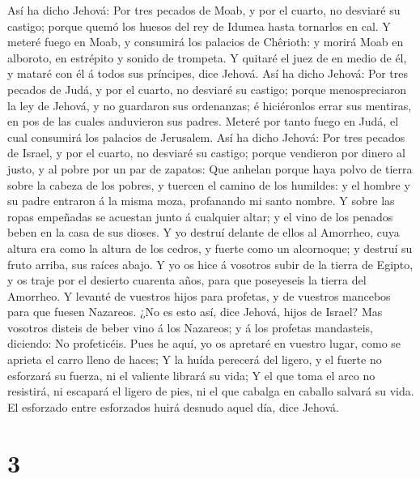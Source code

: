  Así ha dicho Jehová: Por tres pecados de Moab, y por el
cuarto, no desviaré su castigo; porque quemó los huesos del rey de
Idumea hasta tornarlos en cal.  Y meteré fuego en Moab, y
consumirá los palacios de Chêrioth: y morirá Moab en alboroto, en
estrépito y sonido de trompeta.  Y quitaré el juez de en
medio de él, y mataré con él á todos sus príncipes, dice Jehová.
 Así ha dicho Jehová: Por tres pecados de Judá, y por el
cuarto, no desviaré su castigo; porque menospreciaron la ley de Jehová,
y no guardaron sus ordenanzas; é hiciéronlos errar sus mentiras, en pos
de las cuales anduvieron sus padres.  Meteré por tanto
fuego en Judá, el cual consumirá los palacios de Jerusalem.
 Así ha dicho Jehová: Por tres pecados de Israel, y por el
cuarto, no desviaré su castigo; porque vendieron por dinero al justo, y
al pobre por un par de zapatos:  Que anhelan porque haya
polvo de tierra sobre la cabeza de los pobres, y tuercen el camino de
los humildes: y el hombre y su padre entraron á la misma moza,
profanando mi santo nombre.  Y sobre las ropas empeñadas
se acuestan junto á cualquier altar; y el vino de los penados beben en
la casa de sus dioses.  Y yo destruí delante de ellos al
Amorrheo, cuya altura era como la altura de los cedros, y fuerte como un
alcornoque; y destruí su fruto arriba, sus raíces abajo. 
Y yo os hice á vosotros subir de la tierra de Egipto, y os traje por el
desierto cuarenta años, para que poseyeseis la tierra del Amorrheo.
 Y levanté de vuestros hijos para profetas, y de vuestros
mancebos para que fuesen Nazareos. ¿No es esto así, dice Jehová, hijos
de Israel?  Mas vosotros disteis de beber vino á los
Nazareos; y á los profetas mandasteis, diciendo: No profeticéis.
 Pues he aquí, yo os apretaré en vuestro lugar, como se
aprieta el carro lleno de haces;  Y la huída perecerá del
ligero, y el fuerte no esforzará su fuerza, ni el valiente librará su
vida;  Y el que toma el arco no resistirá, ni escapará el
ligero de pies, ni el que cabalga en caballo salvará su vida.
 El esforzado entre esforzados huirá desnudo aquel día,
dice Jehová.

\hypertarget{section-2}{%
\section{3}\label{section-2}}

